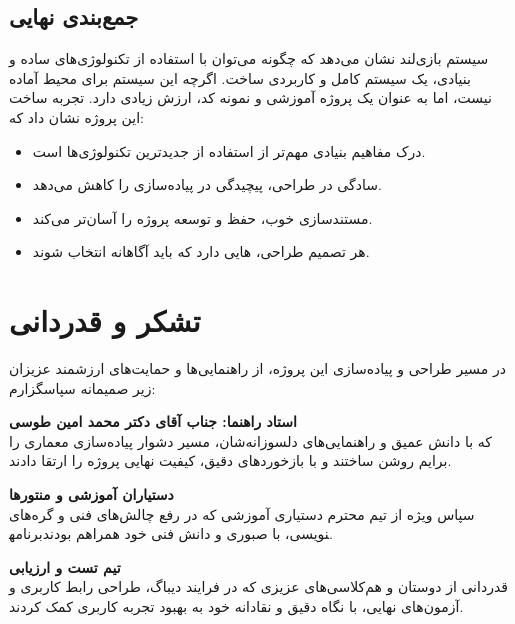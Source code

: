 \documentclass[12pt,a4paper]{article}
\begin{document}
	\subsection{جمع‌بندی نهایی}
	سیستم بازی‌لند نشان می‌دهد که چگونه می‌توان با استفاده از تکنولوژی‌های ساده و بنیادی، یک سیستم کامل و کاربردی ساخت.
	اگرچه این سیستم برای محیط  آماده نیست، اما به عنوان یک پروژه آموزشی و نمونه کد، ارزش زیادی دارد.
	تجربه ساخت این پروژه نشان داد که:
	
	\begin{itemize}
		\item درک مفاهیم بنیادی مهم‌تر از استفاده از جدیدترین تکنولوژی‌ها است.
		\item سادگی در طراحی، پیچیدگی در پیاده‌سازی را کاهش می‌دهد.
		\item مستندسازی خوب، حفظ و توسعه پروژه را آسان‌تر می‌کند.
		\item هر تصمیم طراحی،  هایی دارد که باید آگاهانه انتخاب شوند.
	\end{itemize}
	
	
	\newpage
	\section*{تشکر و قدردانی}
	
	در مسیر طراحی و پیاده‌سازی این پروژه، از راهنمایی‌ها و حمایت‌های ارزشمند عزیزان زیر صمیمانه سپاسگزارم:
	
	\vspace{0.5cm}
	
	\noindent \textbf{استاد راهنما: جناب آقای دکتر محمد امین طوسی}\\
	که با دانش عمیق و راهنمایی‌های دلسوزانه‌شان، مسیر دشوار پیاده‌سازی معماری  را برایم روشن ساختند و با بازخوردهای دقیق، کیفیت نهایی پروژه را ارتقا دادند.
	
	\vspace{0.3cm}
	
	\noindent \textbf{دستیاران آموزشی و منتورها}\\
	سپاس ویژه از تیم محترم دستیاری آموزشی که در رفع چالش‌های فنی و گره‌های برنامه‎نویسی، با صبوری و دانش فنی خود همراهم بودند.
	
	\vspace{0.3cm}
	
	\noindent \textbf{تیم تست و ارزیابی}\\
	قدردانی از دوستان و هم‌کلاسی‌های عزیزی که در فرایند دیباگ، طراحی رابط کاربری و آزمون‌های نهایی، با نگاه دقیق و نقادانه خود به بهبود تجربه کاربری کمک کردند.
	
\end{document}
